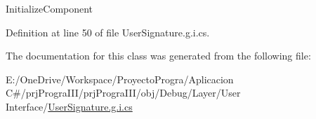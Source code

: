 Initialize\+Component 



Definition at line 50 of file User\+Signature.\+g.\+i.\+cs.



The documentation for this class was generated from the following file\+:\begin{DoxyCompactItemize}
\item 
E\+:/\+One\+Drive/\+Workspace/\+Proyecto\+Progra/\+Aplicacion C\#/prj\+Progra\+I\+I\+I/prj\+Progra\+I\+I\+I/obj/\+Debug/\+Layer/\+User Interface/\hyperlink{_user_signature_8g_8i_8cs}{User\+Signature.\+g.\+i.\+cs}\end{DoxyCompactItemize}
